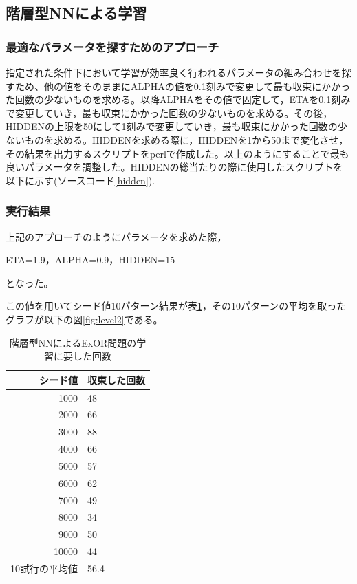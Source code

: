 \subsection{階層型NNによる学習}
\subsubsection{最適なパラメータを探すためのアプローチ}
指定された条件下において学習が効率良く行われるパラメータの組み合わせを探
すため、他の値をそのままにALPHAの値を0.1刻みで変更して最も収束にかかった回数の少ないものを求める。以降ALPHAをその値で固定して，ETAを0.1刻みで変更していき，最も収束にかかった回数の少ないものを求める。その後，HIDDENの上限を50にして1刻みで変更していき，最も収束にかかった回数の少ないものを求める。HIDDENを求める際に，HIDDENを1から50まで変化させ，その結果を出力するスクリプトをperlで作成した。以上のようにすることで最も良いパラメータを調整した。HIDDENの総当たりの際に使用したスクリプトを以下に示す(ソースコード\ref{hidden}).



\subsubsection{実行結果}
上記のアプローチのようにパラメータを求めた際，

ETA=1.9，ALPHA=0.9，HIDDEN=15

となった。

この値を用いてシード値10パターン結果が表\ref{table:level2}，その10パターンの平均を取ったグラフが以下の図\ref{fig:level2}である。

\begin{table}[htb]
 \begin{center}
  \caption{階層型NNによるExOR問題の学習に要した回数}
  \label{table:level2}
  \begin{tabular}[htb]{r|l} \hline
   シード値 & 収束した回数 \\ \hline \hline
   1000 & 48 \\ \hline
   2000 & 66 \\ \hline
   3000 & 88 \\ \hline
   4000 & 66 \\ \hline
   5000 & 57 \\ \hline
   6000 & 62 \\ \hline
   7000 & 49 \\ \hline
   8000 & 34 \\ \hline
   9000 & 50 \\ \hline
   10000 & 44 \\ \hline \hline
   10試行の平均値 & 56.4 \\ \hline
  \end{tabular}
 \end{center}
\end{table}

